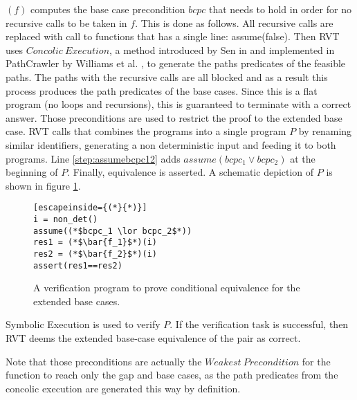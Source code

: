 $(f)$ computes the base case precondition $bcpc$ that needs to hold in order for no recursive calls to be taken in $f$. This is done as follows. All recursive calls are replaced with call to functions that has a single line: assume(false). Then RVT uses $Concolic\ Execution$, a method introduced by Sen in \cite{10.1145/1321631.1321746} and implemented in PathCrawler by Williams et al. \cite{10.1007/11408901_21}, to generate the paths predicates of the feasible paths. The paths with the recursive calls are all blocked and as a result this process produces the path predicates of the base cases. Since this is a flat program (no loops and recursions), this is guaranteed to terminate with a correct answer. Those preconditions are used to restrict the proof to the extended base case. RVT calls  that combines the programs into a single program $P$ by renaming similar identifiers, generating a non deterministic input and feeding it to both programs. 
Line \ref{step:assumebcpc12} adds $assume(bcpc_1 \lor bcpc_2)$ at the beginning of $P$. Finally, equivalence is asserted. A schematic depiction of $P$ is shown in figure \ref{fig:basegapvefprogram}. 
\begin{figure} [h]
\begin{center}
\begin{minipage}{7 cm}
\begin{lstlisting}[escapeinside={(*}{*)}]
i = non_det()
assume((*$bcpc_1 \lor bcpc_2$*))
res1 = (*$\bar{f_1}$*)(i)
res2 = (*$\bar{f_2}$*)(i)
assert(res1==res2)
\end{lstlisting}
\end{minipage}
\caption{A verification program to prove conditional equivalence for the extended base cases.}
\label{fig:basegapvefprogram}
\end{center}
\end{figure}
Symbolic Execution is used to verify $P$. If the verification task is successful, then RVT deems the extended base-case equivalence of the pair as correct. 

 
Note that those preconditions are actually the $Weakest\ Precondition$ \cite{10.1145/360933.360975} for the function to reach only the gap and base cases, as the path predicates from the concolic execution are generated this way by definition.

